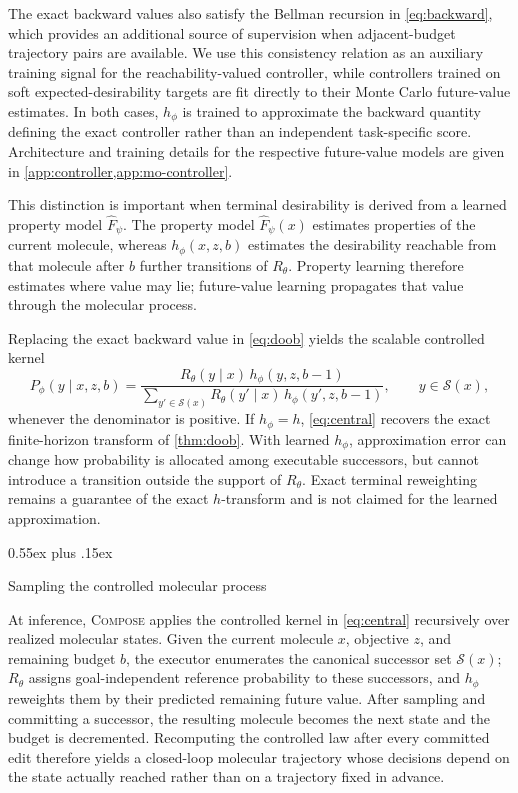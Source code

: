 \documentclass{article}
\makeatletter
\theoremstyle{definition}
\theoremstyle{remark}
\newcommand{\method}{\textsc{Compose}\xspace}
\def\subsection{\@startsection{subsection}{2}{\z@}{-1.2ex plus -0.4ex minus -.2ex}%
  {0.55ex plus .15ex}{\normalsize\sc\raggedright}}
\newcommand{\Sset}{\mathcal{S}}
\makeatother
\begin{document}
The exact backward values also satisfy the Bellman recursion in \cref{eq:backward}, which provides an additional source of supervision when adjacent-budget trajectory pairs are available. We use this consistency relation as an auxiliary training signal for the reachability-valued controller, while controllers trained on soft expected-desirability targets are fit directly to their Monte Carlo future-value estimates. In both cases, $h_\phi$ is trained to approximate the backward quantity defining the exact controller rather than an independent task-specific score. Architecture and training details for the respective future-value models are given in \cref{app:controller,app:mo-controller}.

This distinction is important when terminal desirability is derived from a learned property model $\widehat F_\psi$. The property model $\widehat F_\psi(x)$ estimates properties of the current molecule, whereas $h_\phi(x,z,b)$ estimates the desirability reachable from that molecule after $b$ further transitions of $R_\theta$. Property learning therefore estimates where value may lie; future-value learning propagates that value through the molecular process.

Replacing the exact backward value in \cref{eq:doob} yields the scalable controlled kernel
\begin{equation}
P_\phi(y\mid x,z,b)=\frac{R_\theta(y\mid x)\,h_\phi(y,z,b-1)}{\displaystyle\sum_{y'\in\Sset(x)}R_\theta(y'\mid x)\,h_\phi(y',z,b-1)},
\qquad y\in\Sset(x),
\label{eq:central}
\end{equation}
whenever the denominator is positive. If $h_\phi=h$, \cref{eq:central} recovers the exact finite-horizon transform of \cref{thm:doob}. With learned $h_\phi$, approximation error can change how probability is allocated among executable successors, but cannot introduce a transition outside the support of $R_\theta$. Exact terminal reweighting remains a guarantee of the exact $h$-transform and is not claimed for the learned approximation.

\subsection{Sampling the controlled molecular process}
\label{sec:sampling}

At inference, \method{} applies the controlled kernel in \cref{eq:central} recursively over realized molecular states. Given the current molecule $x$, objective $z$, and remaining budget $b$, the executor enumerates the canonical successor set $\Sset(x)$; $R_\theta$ assigns goal-independent reference probability to these successors, and $h_\phi$ reweights them by their predicted remaining future value. After sampling and committing a successor, the resulting molecule becomes the next state and the budget is decremented. Recomputing the controlled law after every committed edit therefore yields a closed-loop molecular trajectory whose decisions depend on the state actually reached rather than on a trajectory fixed in advance.
\end{document}
